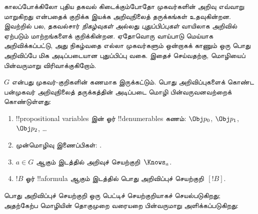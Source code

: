\documentclass[../../../include/open-logic-section]{subfiles}
\begin{document}


காலப்போக்கிலோ புதிய தகவல் கிடைக்கும்போதோ முகவர்களின் அறிவு எவ்வாறு
மாறுகிறது என்பதைக் குறிக்க இயக்க அறிவுநிலைத் தருக்கங்கள் உதவுகின்றன.
இவற்றில் பல, தகவல்சார் \emph{நிகழ்வுகள்} அல்லது \emph{புதுப்பிப்புகள்}
வாயிலாக அறிவில் ஏற்படும் மாற்றங்களைக் குறிக்கின்றன. ஏதோவொரு வாய்பாடு
மெய்யாக அறிவிக்கப்பட்டு, அது நிகழ்வதை எல்லா முகவர்களும் ஒன்றாகக் காணும்
ஒரு பொது அறிவிப்பே மிக அடிப்படையான புதுப்பிப்பு வகை. இதைச் செய்வதற்கு,
மொழியைப் பின்வருமாறு விரிவாக்குகிறோம்.

\begin{defn}
$G$ என்பது முகவர்-குறிகளின் கணமாக இருக்கட்டும். பொது அறிவிப்புகளைக் கொண்ட
பன்முகவர் அறிவுநிலைத் தருக்கத்தின் அடிப்படை மொழி பின்வருவனவற்றைக்
கொண்டுள்ளது:
\begin{enumerate}
  \item !!{propositional variable}s இன் ஓர் !!{denumerable}s கணம்: $\Obj
    p_0$, $\Obj p_1$, $\Obj p_2$, \dots
  \item முன்மொழிவு இணைப்பிகள்: \startycommalist
  .
  \item $a \in G$ ஆகும் இடத்தில் அறிவுச் செயற்குறி~$\Knows_a$.
  \item $!B$ ஓர் !!a{formula} ஆகும் இடத்தில் பொது அறிவிப்புச்
    செயற்குறி~$[!B]$.
\end{enumerate}
\end{defn}

பொது அறிவிப்புச் செயற்குறி ஒரு பெட்டிச் செயற்குறியாகச் செயல்படுகிறது;
அதற்கேற்ப மொழியின் தொகுமுறை வரையறை பின்வருமாறு அளிக்கப்படுகிறது:
\end{document}
